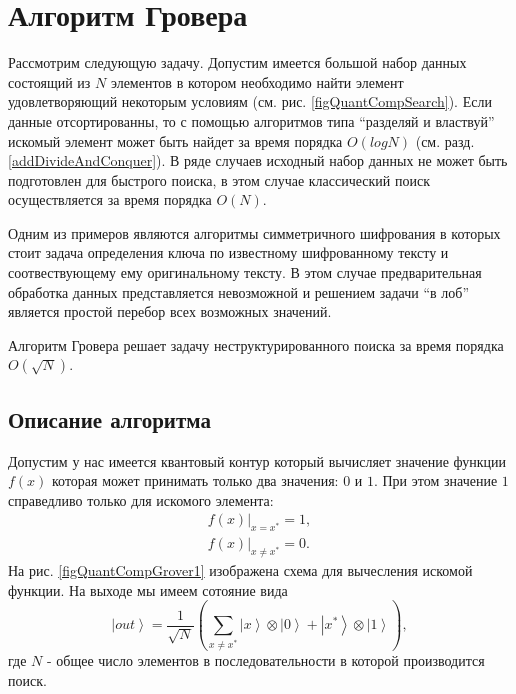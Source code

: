 \section{Алгоритм Гровера}
Рассмотрим следующую задачу. Допустим имеется большой набор данных
состоящий из $N$ элементов в котором необходимо найти элемент
удовлетворяющий некоторым условиям (см. рис. \ref{figQuantCompSearch}).
Если данные отсортированны, то с  
помощью алгоритмов типа ``разделяй и властвуй'' искомый элемент может
быть найдет за время порядка $O\left(log N\right)$
(см. разд. \ref{addDivideAndConquer}). В ряде случаев исходный набор данных
не может быть подготовлен для быстрого поиска, в этом случае
классический поиск осуществляется за время порядка $O\left(N\right)$.



Одним из примеров являются алгоритмы симметричного шифрования в
которых стоит задача определения ключа по известному шифрованному
тексту и соотвествующему ему оригинальному тексту. В этом случае
предварительная обработка данных представляется невозможной и решением
задачи ``в лоб'' является простой перебор всех возможных значений.

Алгоритм Гровера \cite{Grover96afast} решает задачу
неструктурированного поиска за время порядка $O\left(\sqrt{N}\right)$.

\subsection{Описание алгоритма}

Допустим у нас имеется квантовый контур который вычисляет значение
функции $f\left(x\right)$ которая может принимать только два значения:
$0$ и $1$. При этом значение $1$ справедливо только для искомого
элемента: 
\begin{eqnarray}
\left.f\left(x\right)\right|_{x = x^{\ast}} = 1,
\nonumber \\
\left.f\left(x\right)\right|_{x \ne x^{\ast}} = 0.
\label{eqQuantCompGroverF}
\end{eqnarray}
На рис. \ref{figQuantCompGrover1} изображена схема для вычесления
искомой функции. На выходе мы имеем сотояние вида
\begin{equation}
\left|out\right> = \frac{1}{\sqrt{N}}\left(
 \sum_{x \ne x^{\ast}} \left|x\right>\otimes\left|0\right>
+ \left|x^{\ast}\right>\otimes\left|1\right>
\right),
\label{eqQuantCompGroverFake}
\end{equation}
где $N$ - общее число элементов в последовательности в которой
производится поиск.


